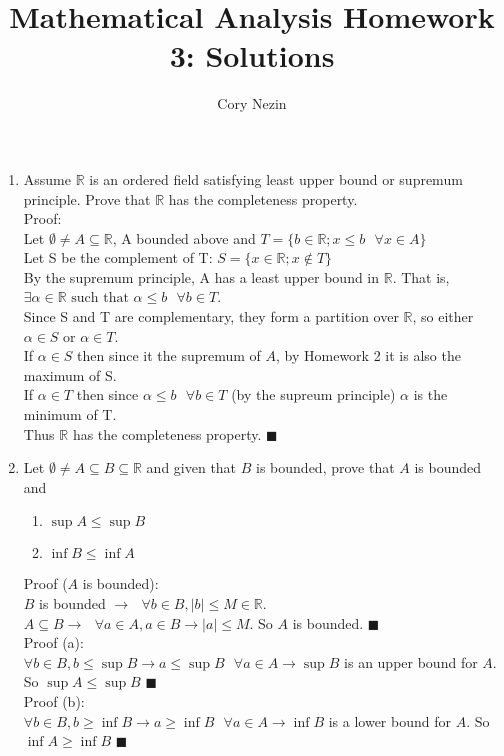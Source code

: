 \documentclass[12pt]{article}
\title{Mathematical Analysis Homework 3: Solutions}
\author{Cory Nezin}
\begin{document}
\maketitle
\begin{enumerate}
\item Assume $\mathbb{R}$ is an ordered field satisfying least upper bound or supremum principle.  Prove that $\mathbb{R}$ has the completeness property.\\

Proof:\\
Let $\emptyset \neq A \subseteq \mathbb{R}$, A bounded above and $T = \{b \in \mathbb{R}; x \leq b \text{ }\forall x \in A\}$\\
Let S be the complement of T: $S = \{x\in\mathbb{R};x\notin T\}$\\
By the supremum principle, A has a least upper bound in $\mathbb{R}$.  That is, $\exists \alpha \in \mathbb{R} \text{ such that } \alpha \leq b \text{ } \forall b\in T$.\\

Since S and T are complementary, they form a partition over $\mathbb{R}$, so either $\alpha \in S$ or $\alpha \in T$.\\

If $\alpha \in S$ then since it the supremum of $A$, by Homework 2 it is also the maximum of S.\\
If $\alpha \in T$ then since $\alpha \leq b \text{ } \forall b \in T$ (by the supreum principle)  $\alpha$ is the minimum of T.\\
Thus $\mathbb{R}$ has the completeness property. $\blacksquare$

\item Let $\emptyset \neq A \subseteq B \subseteq \mathbb{R}$ and given that $B$ is bounded, prove that $A$ is bounded and
\begin{enumerate}
\item $\sup A \leq \sup B$
\item $\inf B \leq \inf A$
\end{enumerate}
Proof ($A$ is bounded):\\
$B$ is bounded $\rightarrow \text{ } \forall b\in B, |b| \leq M \in \mathbb{R}$.\\
$A \subseteq B \rightarrow \text{ } \forall a\in A, a\in B \rightarrow |a| \leq M$.  So $A$ is bounded. $\blacksquare$\\

Proof (a):\\
$\forall b\in B, b \leq \sup B \rightarrow a \leq \sup B \text{ } \forall a\in A \rightarrow \sup B$ is an upper bound for $A$.  So $\sup A \leq \sup B$ $\blacksquare$\\
Proof (b):\\
$\forall b\in B, b \geq \inf B \rightarrow a \geq \inf B \text{ } \forall a\in A \rightarrow \inf B$ is a lower bound for $A$.  So $\inf A \geq \inf B$ $\blacksquare$
\end{enumerate}
\end{document}
